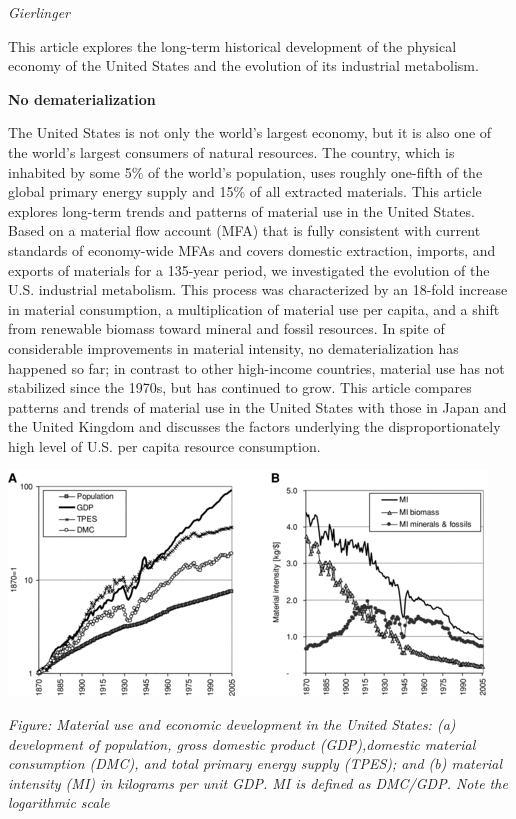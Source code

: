\documentclass[
]{book}
\begin{document}
\emph{Gierlinger}

This article explores the long-term historical development of
the physical economy of the United States and the evolution
of its industrial metabolism.

\textbf{No dematerialization}

The United States is not only the world's largest economy, but it is also one of the world's
largest consumers of natural resources. The country, which is inhabited by some 5\% of the
world's population, uses roughly one-fifth of the global primary energy supply and 15\% of
all extracted materials. This article explores long-term trends and patterns of material use
in the United States. Based on a material flow account (MFA) that is fully consistent with
current standards of economy-wide MFAs and covers domestic extraction, imports, and
exports of materials for a 135-year period, we investigated the evolution of the U.S. industrial
metabolism. This process was characterized by an 18-fold increase in material consumption,
a multiplication of material use per capita, and a shift from renewable biomass toward
mineral and fossil resources. In spite of considerable improvements in material intensity, no
dematerialization has happened so far; in contrast to other high-income countries, material
use has not stabilized since the 1970s, but has continued to grow. This article compares
patterns and trends of material use in the United States with those in Japan and the United
Kingdom and discusses the factors underlying the disproportionately high level of U.S. per
capita resource consumption.

\includegraphics{fig/material_use_US.png}

\emph{Figure: Material use and economic development in the United States:
(a) development of population, gross domestic product (GDP),domestic material consumption (DMC),
and total primary energy supply (TPES); and
(b) material intensity (MI) in kilograms per unit GDP.
MI is defined as DMC/GDP.
Note the logarithmic scale}
\end{document}
